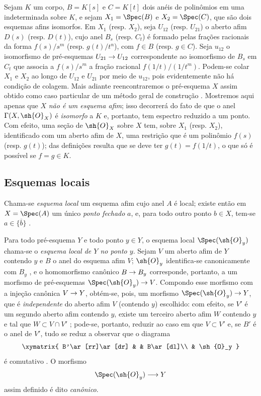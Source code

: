 \documentclass[oneside]{amsart}
\makeatletter
\newcommand{\ega@arrow}[2]{\mathchoice{#1}{#2}{#2}{#2}}
\renewcommand{\to}{\ega@arrow{\longrightarrow}{\rightarrow}}
\let\EGAOriginalLabel\label
\renewcommand{\label}[1]{\phantomsection\EGAOriginalLabel{#1}}
\makeatother
\begin{document}
\begin{example}[2.3.2]
\label{I.2.3.2}
Sejam $K$ um corpo, $B=K[s]$ e $C=K[t]$ dois anéis de polinômios em uma
indeterminada sobre $K$, e sejam $X_1=\Spec(B)$ e $X_2=\Spec(C)$, que são
dois esquemas afins isomorfos. Em $X_1$ (resp. $X_2$), seja $U_{12}$
(resp. $U_{21}$) o aberto afim $D(s)$ (resp. $D(t)$), cujo anel $B_s$
(resp. $C_t$) é formado pelas frações racionais da forma $f(s)/s^m$
(resp. $g(t)/t^n$), com $f\in B$ (resp. $g\in C$). Seja $u_{12}$ o
isomorfismo de pré-esquemas $U_{21}\to U_{12}$ correspondente
 ao isomorfismo de $B_s$ em $C_t$ que associa a
$f(s)/s^m$ a fração racional $f(1/t)/(1/t^m)$. Podem-se colar $X_1$ e
$X_2$ ao longo de $U_{12}$ e $U_{21}$ por meio de $u_{12}$, pois
evidentemente não há condição de colagem. Mais adiante reencontraremos o
pré-esquema $X$ assim obtido como caso particular de um método geral de
construção . Mostremos aqui apenas que $X$
\emph{não é um esquema afim}; isso decorrerá do fato de que o anel
$\Gamma(X,\sh{O}_X)$ é \emph{isomorfo} a $K$ e, portanto, tem espectro
reduzido a um ponto. Com efeito, uma seção de $\sh{O}_X$ sobre $X$ tem,
sobre $X_1$ (resp. $X_2$), identificado com um aberto afim de $X$, uma
restrição que é um polinômio $f(s)$ (resp. $g(t)$); das definições resulta
que se deve ter $g(t)=f(1/t)$, o que só é possível se $f=g\in K$.
\end{example}

\subsection{Esquemas locais}
\label{subsection:I.2.4}

\begin{env}[2.4.1]
\label{I.2.4.1}
Chama-se \emph{esquema local} um esquema afim cujo anel $A$ é local;
existe então em $X=\Spec(A)$ um único \emph{ponto fechado} $a$, e, para
todo outro ponto $b\in X$, tem-se
$a\in\overline{\{b\}}$ .
\end{env}

Para todo pré-esquema $Y$ e todo ponto $y\in Y$, o esquema local
$\Spec(\sh{O}_y)$ chama-se o \emph{esquema local de $Y$ no ponto $y$}.
Sejam $V$ um aberto afim de $Y$ contendo $y$ e $B$ o anel do esquema afim
$V$; $\sh{O}_y$ identifica-se canonicamente com $B_y$ , e o
homomorfismo canônico $B\to B_y$ corresponde, portanto,  a
um morfismo de pré-esquemas $\Spec(\sh{O}_y)\to V$. Compondo esse
morfismo com a injeção canônica $V\to Y$, obtém-se, pois, um morfismo
$\Spec(\sh{O}_y)\to Y$, que é \emph{independente} do aberto afim $V$
(contendo $y$) escolhido: com efeito, se $V'$ é um segundo aberto afim
contendo $y$, existe um terceiro aberto afim $W$ contendo $y$ e tal que
$W\subset V\cap V'$ ; pode-se, portanto, reduzir ao caso em
que $V\subset V'$ e, se $B'$ é o anel de $V'$, tudo se reduz a observar
que o diagrama
\label{I.2.4.1.diagram}
\[
  \xymatrix{
    B'\ar[rr]\ar[dr] & & B\ar[dl]\\
    & \sh{O}_y
  }
\]
é comutativo . O morfismo
\[
  \Spec(\sh{O}_y)\to Y
\]
assim definido é dito \emph{canônico}.
\end{document}
